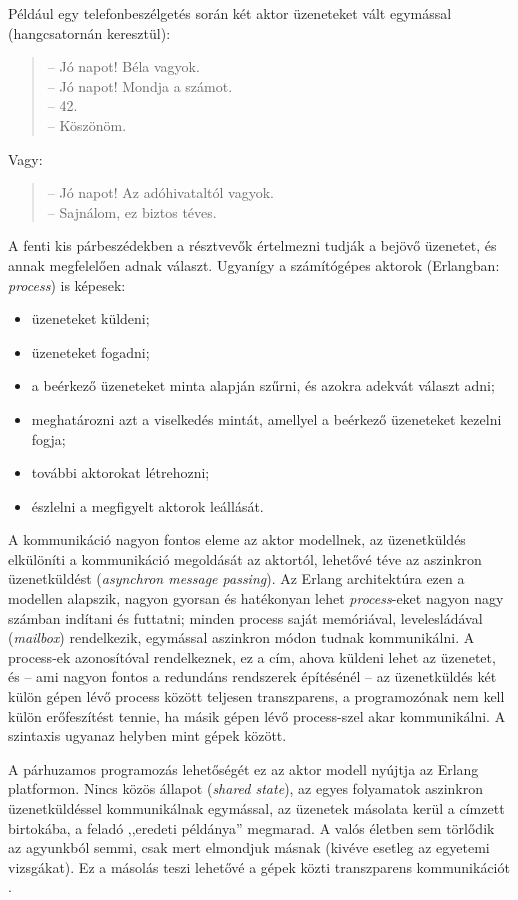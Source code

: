 \documentclass[12pt, a4paper, oneside]{book}
\begin{document}
Például egy telefonbeszélgetés során két aktor üzeneteket vált egymással
(hangcsatornán keresztül):

\begin{quote}
-- Jó napot! Béla vagyok.\\
-- Jó napot! Mondja a számot.\\
-- 42.\\
-- Köszönöm.
\end{quote}
\par\noindent Vagy:
\begin{quote}
-- Jó napot! Az adóhivataltól vagyok.\\
-- Sajnálom, ez biztos téves.
\end{quote}
\noindent A fenti kis párbeszédekben a résztvevők értelmezni tudják a bejövő
üzenetet, és annak megfelelően adnak választ. Ugyanígy a számítógépes 
aktorok (Erlangban: \emph{process}) is képesek:
\begin{itemize}
  \item üzeneteket küldeni;
  \item üzeneteket fogadni;
  \item a beérkező üzeneteket minta alapján szűrni, és azokra adekvát választ
adni;
  \item meghatározni azt a viselkedés mintát, amellyel a beérkező üzeneteket
kezelni fogja;
  \item további aktorokat létrehozni;
  \item észlelni a megfigyelt aktorok leállását. 
\end{itemize}

A kommunikáció nagyon fontos eleme az aktor modellnek, az üzenetküldés
elkülöníti a kommunikáció megoldását az aktortól, lehetővé téve az aszinkron
üzenetküldést (\emph{asynchron message passing}). Az Erlang architektúra ezen a
modellen alapszik, nagyon gyorsan és hatékonyan lehet \emph{process}-eket
nagyon nagy számban indítani és futtatni; minden process saját
memóriával, levelesládával (\emph{mailbox}) rendelkezik, egymással aszinkron
módon tudnak kommunikálni. A process-ek azonosítóval rendelkeznek, ez a cím,
ahova küldeni lehet az üzenetet, és -- ami nagyon fontos a redundáns rendszerek
építésénél -- az üzenetküldés két külön gépen lévő process között teljesen
transzparens, a programozónak nem kell külön erőfeszítést tennie, ha másik
gépen lévő process-szel akar kommunikálni. A szintaxis ugyanaz helyben mint gépek
között.

A párhuzamos programozás lehetőségét ez az aktor modell nyújtja az Erlang
platformon. Nincs közös állapot (\emph{shared state}), az egyes folyamatok
aszinkron üzenetküldéssel kommunikálnak egymással, az üzenetek másolata kerül a
címzett birtokába, a feladó ,,eredeti példánya'' megmarad. A valós életben sem
törlődik az agyunkból semmi, csak mert elmondjuk másnak (kivéve esetleg az
egyetemi vizsgákat). Ez a másolás teszi lehetővé a gépek közti transzparens
kommunikációt \citep{CesariniBook}.
\end{document}
